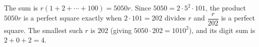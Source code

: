 The sum is $r(1+2+\cdots+100)=5050r$. Since $5050=2\cdot5^2\cdot101$, the product $5050r$ is a perfect square exactly when $2\cdot101=202$ divides $r$ and $\dfrac{r}{202}$ is a perfect square. The smallest such $r$ is $202$ (giving $5050\cdot202=1010^2$), and its digit sum is $2+0+2=\boxed{4}$.
